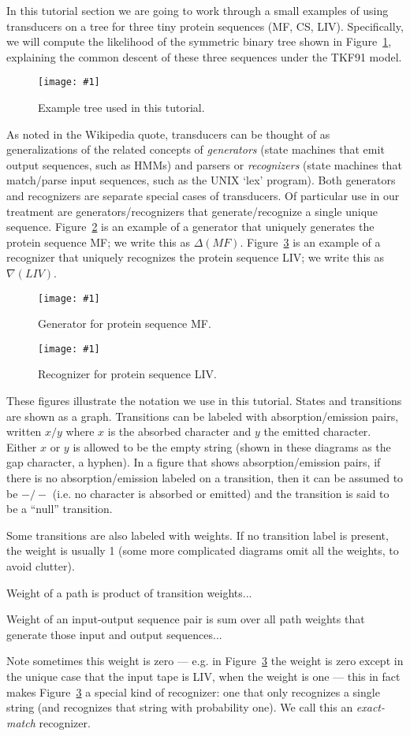 \documentclass{article}
\newcommand{\figref}[1]{Figure~\ref{Figures.#1}}
\newcommand{\figlabel}[1]{\label{Figures.#1}}
\newcommand{\easyfig}[4]{
\begin{figure}
\texttt{[image: \#1]}
\caption{ \figlabel{#3} #4}
\end{figure}}
\newcommand{\pngfig}[2]{\easyfig{#1.png}{}{#1}{#2}}
\newcommand{\pdffig}[2]{\easyfig{#1-fig.pdf}{}{#1}{#2}}
\newcommand\generate{\Delta}
\newcommand\recognize{\nabla}
\begin{document}
In this tutorial section we are going to work through a small examples of using transducers on a tree
for three tiny protein sequences (MF, CS, LIV).
Specifically, we will compute the likelihood of the symmetric binary tree shown in \figref{cs-mf-liv-tree},
explaining the common descent of these three sequences
under the TKF91 model.
\pdffig{cs-mf-liv-tree}{Example tree used in this tutorial.}

As noted in the Wikipedia quote, transducers can be thought of as generalizations of the related
concepts of {\em generators} (state machines that emit output sequences, such as HMMs)
and parsers or {\em recognizers} (state machines that match/parse input sequences, such as the UNIX `lex' program).
Both generators and recognizers are separate special cases of transducers.
Of particular use in our treatment are generators/recognizers that generate/recognize a single unique sequence.
\figref{mf-generator} is an example of a generator that uniquely generates the protein sequence MF;
we write this as $\generate(MF)$.
\figref{liv-small} is an example of a recognizer that uniquely recognizes the protein sequence LIV;
we write this as $\recognize(LIV)$.

\pngfig{mf-generator}{Generator for protein sequence MF.}

\pngfig{liv-small}{Recognizer for protein sequence LIV.}

These figures illustrate the notation we use in this tutorial.
States and transitions are shown as a graph.
Transitions can be labeled with absorption/emission pairs,
written $x/y$ where $x$ is the absorbed character and $y$ the emitted character.
Either $x$ or $y$ is allowed to be the empty string (shown in these diagrams as the gap character, a hyphen).
In a figure that shows absorption/emission pairs,
if there is no absorption/emission labeled on a transition, then it can be assumed to be $-/-$
(i.e. no character is absorbed or emitted) and the transition is said to be a ``null'' transition.

Some transitions are also labeled with weights.
If no transition label is present, the weight is usually 1
(some more complicated diagrams omit all the weights, to avoid clutter).

Weight of a path is product of transition weights...

Weight of an input-output sequence pair is sum over all path weights that generate those input and output sequences...

Note sometimes this weight is zero --- e.g. in \figref{liv-small} the weight is zero
except in the unique case that the input tape is LIV, when the weight is one ---
this in fact makes \figref{liv-small} a special kind of recognizer:
one that only recognizes a single string
(and recognizes that string with probability one).
We call this an {\em exact-match} recognizer.
\end{document}
